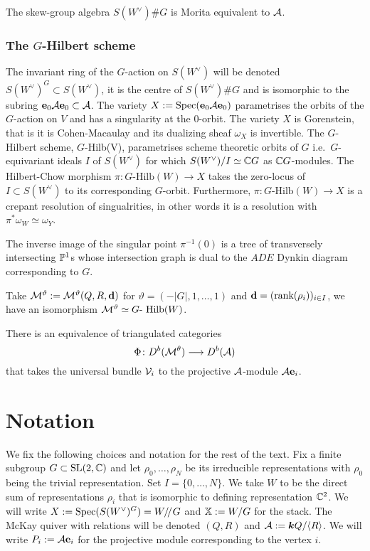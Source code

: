 \documentclass{amsart}
\theoremstyle{definition}
\begin{document}
\begin{theorem}
The skew-group algebra $S(W^\vee) \# G$ is Morita equivalent to $\mathcal{A}$.
\end{theorem}

\subsubsection{The $G$-Hilbert scheme}

The invariant ring of the $G$-action on $S(W^\vee)$ will be denoted $S(W^\vee)^G \subset S(W^\vee)$, it is the centre of $S(W^\vee) \# G$ and is isomorphic to the subring $\mathbf{e}_0 \mathcal{A} \mathbf{e}_0 \subset \mathcal{A}$.
The variety $X:= \operatorname{Spec}(\mathbf{e}_0 \mathcal{A} \mathbf{e}_0)$ parametrises the orbits of the $G$-action on $V$ and has a singularity at the $0$-orbit.
The variety $X$ is Gorenstein, that is it is Cohen-Macaulay and its dualizing sheaf $\omega_X$ is invertible.
The $G$-Hilbert scheme, $G$-Hilb(V), parametrises scheme theoretic orbits of $G$ i.e.\ $G$-equivariant ideals $I$ of $S(W^\vee)$ for which $S(W^\vee)/I \simeq \mathbb{C} G$ as $\mathbb{C} G$-modules.
The Hilbert-Chow morphism $\pi \colon G\text{-Hilb}(W) \rightarrow X$ takes the zero-locus of $I \subset S(W^\vee)$ to its corresponding $G$-orbit.
Furthermore, $\pi \colon G\text{-Hilb}(W) \rightarrow X$ is a crepant resolution of singualrities, in other words it is a resolution with $\pi^*\omega_W \simeq \omega_Y$.

\begin{theorem}
The inverse image of the singular point $\pi^{-1}(0)$ is a tree of transversely intersecting $\mathbb{P}^1$s whose intersection graph is dual to the $ADE$ Dynkin diagram corresponding to $G$.
\end{theorem}

Take $\mathcal{M}^\vartheta:=\mathcal{M}^\vartheta(Q,R,\mathbf{d})$ for $\vartheta = (-|G|,1, \ldots, 1)$ and $\mathbf{d}=(\text{rank}(\rho_i))_{i \in I}$, we have an isomorphism $\mathcal{M}^\vartheta \simeq G\text{- Hilb}(W)$.

\begin{theorem}
There is an equivalence of triangulated categories $$\Phi \colon D^b(\mathcal{M}^\theta) \longrightarrow D^b(\mathcal{A})$$ that takes the universal bundle $\mathcal{V}_i$ to the projective $\mathcal{A}$-module $\mathcal{A}\mathbf{e}_i$.
\end{theorem}

\section*{Notation}
We fix the following choices and notation for the rest of the text.
Fix a finite subgroup $G \subset \operatorname{SL}(2,\mathbb{C})$ and let $\rho_0, \ldots, \rho_N$ be its
irreducible representations with $\rho_0$ being the trivial representation.
Set $I=\{0,\ldots,N\}$.
We take $W$ to be the direct sum of representations $\rho_i$ that is isomorphic to defining representation $\mathbb{C}^2$.
We will write $X:=\operatorname{Spec}(S(W^\vee)^G) = W / \! /_{} G$ and $\mathbb{X}:=W/G$ for the stack.
The McKay quiver with relations will be denoted $(Q,R)$ and $\mathcal{A}:= {\boldsymbol{k}} Q/ \langle R\rangle$.
We will write $P_i:= \mathcal{A}\mathbf{e}_i$ for the projective module corresponding to the vertex $i$.
\end{document}

